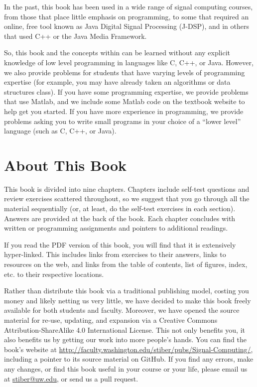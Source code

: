 In the past, this book has been used in a wide range of signal
computing courses, from those that place little emphasis on
programming, to some that required an online, free tool known as Java
Digital Signal Processing (J-DSP), and in others that used C++ or the
Java Media Framework.

So, this book and the concepts within can be learned without any
explicit knowledge of low level programming in languages like C, C++,
or Java.  However, we also provide problems for students that have
varying levels of programming expertise (for example, you may have
already taken an algorithms or data structures class). If you have
some programming expertise, we provide problems that use Matlab, and
we include some Matlab code on the textbook website to help get you
started. If you have more experience in programming, we provide
problems asking you to write small programs in your choice of a
``lower level'' language (such as C, C++, or Java).

\section*{About This Book}

This book is divided into nine chapters. Chapters include self-test
questions and review exercises scattered throughout, so we suggest
that you go through all the material sequentially (or, at least, do
the self-test exercises in each section). Answers are provided at the
back of the book. Each chapter concludes with written or programming
assignments and pointers to additional readings.

 If you read the PDF version of this book, you will find
that it is extensively hyper-linked.  This includes links from
exercises to their answers, links to resources on the web, and links
from the table of contents, list of figures, index, etc. to their
respective locations.

Rather than distribute this book via a traditional publishing model,
costing you money and likely netting us very little, we have decided
to make this book freely available for both students and
faculty. Moreover, we have opened the source material for re-use,
updating, and expansion via a Creative Commons Attribution-ShareAlike
4.0 International License. This not only benefits you, it also
benefits us by getting our work into more people's hands.  You can
find the book's website at
\url{http://faculty.washington.edu/stiber/pubs/Signal-Computing/},
including a pointer to its source material on GitHub. If you find any
errors, make any changes, or find this book useful in your course or
your life, please email us at
\href{mailto:stiber@uw.edu}{stiber@uw.edu}, or send us a pull request.


